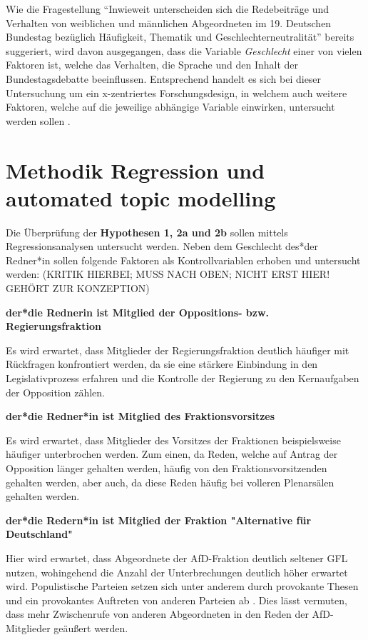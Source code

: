 \documentclass[12pt, 
    twoside=false, 
    bibliography=totoc, 
    numbers=endperiod, 
    headings=normal, 
    toc=chapterentrydotfill
    ]{scrbook}
\begin{document}
Wie die Fragestellung \enquote{Inwieweit unterscheiden sich die Redebeiträge und Verhalten von weiblichen und männlichen Abgeordneten im 19. Deutschen Bundestag bezüglich Häufigkeit, Thematik und Geschlechterneutralität} bereits suggeriert, wird davon ausgegangen, dass die Variable \emph{Geschlecht} einer von vielen Faktoren ist, welche das Verhalten, die Sprache und den Inhalt der Bundestagsdebatte beeinflussen. Entsprechend handelt es sich bei dieser Untersuchung um ein x-zentriertes Forschungsdesign, in welchem auch weitere Faktoren, welche auf die jeweilige abhängige Variable einwirken, untersucht werden sollen  \parencites[vgl.][3f.]{ganghof_2005}.

\section{Methodik Regression und automated topic modelling}


Die Überprüfung der \textbf{Hypothesen 1, 2a und 2b} sollen mittels Regressionsanalysen untersucht werden. Neben dem Geschlecht des*der Redner*in sollen folgende Faktoren als Kontrollvariablen erhoben und untersucht werden: (KRITIK HIERBEI; MUSS NACH OBEN; NICHT ERST HIER! GEHÖRT ZUR KONZEPTION)

\textbf{der*die Rednerin ist Mitglied der Oppositions- bzw. Regierungsfraktion}

Es wird erwartet, dass Mitglieder der Regierungsfraktion deutlich häufiger mit Rückfragen konfrontiert werden, da sie eine stärkere Einbindung in den Legislativprozess erfahren und die Kontrolle der Regierung zu den Kernaufgaben der Opposition zählen.

\textbf{der*die Redner*in ist Mitglied des Fraktionsvorsitzes}

Es wird erwartet, dass Mitglieder des Vorsitzes der Fraktionen beispielsweise häufiger unterbrochen werden. Zum einen, da Reden, welche auf Antrag der Opposition länger gehalten werden, häufig von den Fraktionsvorsitzenden gehalten werden, aber auch, da diese Reden häufig bei volleren Plenarsälen gehalten werden.

\textbf{der*die Redern*in ist Mitglied der Fraktion "Alternative für Deutschland"}

Hier wird erwartet, dass Abgeordnete der AfD-Fraktion deutlich seltener GFL nutzen, wohingehend die Anzahl der Unterbrechungen deutlich höher erwartet wird. Populistische Parteien setzen sich unter anderem durch provokante Thesen und ein provokantes Auftreten von anderen Parteien ab \parencites[vgl.][]{decker_populismus_2006}{priester_2012}. Dies lässt vermuten, dass mehr Zwischenrufe von anderen Abgeordneten in den Reden der AfD-Mitglieder geäußert werden.
\end{document}
